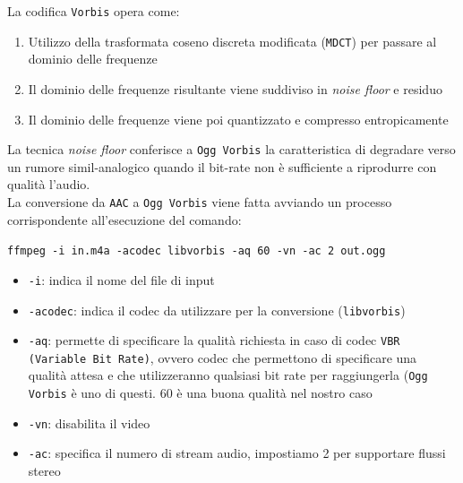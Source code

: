 La codifica \texttt{Vorbis} opera come:
\begin{enumerate}
	\item Utilizzo della trasformata coseno discreta modificata (\texttt{MDCT}) per passare al dominio delle frequenze
	\item Il dominio delle frequenze risultante viene suddiviso in \textit{noise floor} e residuo
	\item Il dominio delle frequenze viene poi quantizzato e compresso entropicamente
\end{enumerate}

La tecnica \textit{noise floor} conferisce a \texttt{Ogg Vorbis} la caratteristica di degradare verso un rumore simil-analogico quando il bit-rate non è sufficiente a riprodurre con qualità l'audio.\\

La conversione da \texttt{AAC} a \texttt{Ogg Vorbis} viene fatta avviando un processo corrispondente all'esecuzione del comando:\\

\begin{center}
	\texttt{ffmpeg -i in.m4a -acodec libvorbis -aq 60 -vn -ac 2 out.ogg}
\end{center}

\begin{itemize}
	\item \texttt{-i}: indica il nome del file di input
	\item \texttt{-acodec}: indica il codec da utilizzare per la conversione (\texttt{libvorbis})
	\item \texttt{-aq}: permette di specificare la qualità richiesta in caso di codec \texttt{VBR (Variable Bit Rate)}, ovvero codec che permettono di specificare una qualità attesa e che utilizzeranno qualsiasi bit rate per raggiungerla (\texttt{Ogg Vorbis} è uno di questi. 60 è una buona qualità nel nostro caso
	\item \texttt{-vn}: disabilita il video
	\item \texttt{-ac}: specifica il numero di stream audio, impostiamo 2 per supportare flussi stereo
\end{itemize}
